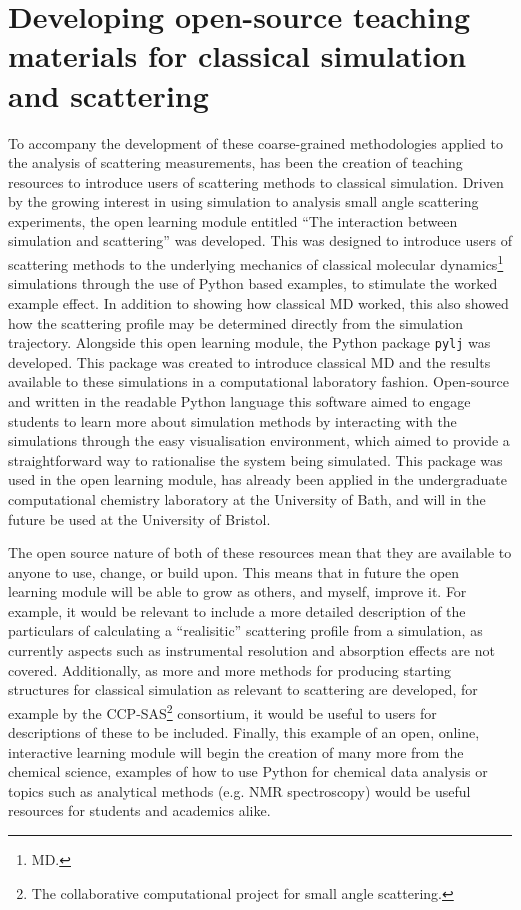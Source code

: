 \section{Developing open-source teaching materials for classical simulation and scattering}
To accompany the development of these coarse-grained methodologies applied to the analysis of scattering measurements, has been the creation of teaching resources to introduce users of scattering methods to classical simulation.
Driven by the growing interest in using simulation to analysis small angle scattering experiments,\autocite{hub_interpreting_2018,perkins_atomistic_2016} the open learning module entitled ``The interaction between simulation and scattering'' was developed.\autocite{mccluskey_introduction_2019,mccluskey_pythoninchemistry/sim_and_scat_2019}
This was designed to introduce users of scattering methods to the underlying mechanics of classical molecular dynamics\footnote{MD.} simulations through the use of Python based examples, to stimulate the worked example effect.
In addition to showing how classical MD worked, this also showed how the scattering profile may be determined directly from the simulation trajectory.
Alongside this open learning module, the Python package \texttt{pylj} was developed.\autocite{mccluskey_pylj_2018,mccluskey_arm61/pylj_2019-2}
This package was created to introduce classical MD and the results available to these simulations in a computational laboratory fashion.
Open-source and written in the readable Python language this software aimed to engage students to learn more about simulation methods by interacting with the simulations through the easy visualisation environment, which aimed to provide a straightforward way to rationalise the system being simulated.
This package was used in the open learning module, has already been applied in the undergraduate computational chemistry laboratory at the University of Bath, and will in the future be used at the University of Bristol.

The open source nature of both of these resources mean that they are available to anyone to use, change, or build upon.
This means that in future the open learning module will be able to grow as others, and myself, improve it.
For example, it would be relevant to include a more detailed description of the particulars of calculating a ``realisitic'' scattering profile from a simulation, as currently aspects such as instrumental resolution and absorption effects are not covered.
Additionally, as more and more methods for producing starting structures for classical simulation as relevant to scattering are developed, for example by the CCP-SAS\footnote{The collaborative computational project for small angle scattering.} consortium, it would be useful to users for descriptions of these to be included.
Finally, this example of an open, online, interactive learning module will begin the creation of many more from the chemical science, examples of how to use Python for chemical data analysis or topics such as analytical methods (e.g. NMR spectroscopy) would be useful resources for students and academics alike.

